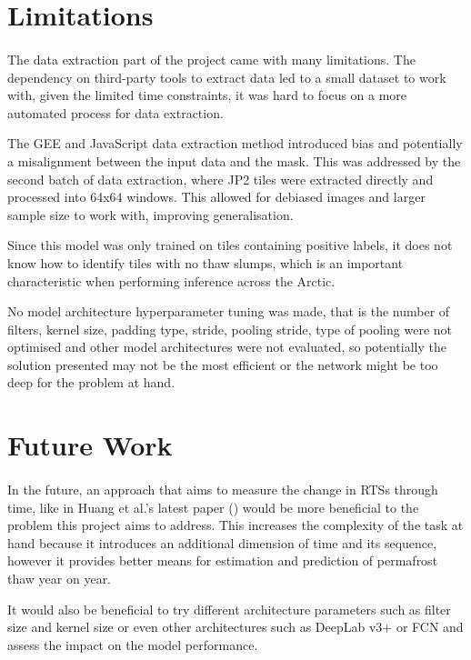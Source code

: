 \section{Limitations}
\paragraph{}
The data extraction part of the project came with many limitations. The dependency on third-party tools to extract data led to a small dataset to work with, given the limited time constraints, it was hard to focus on a more automated process for data extraction.

The \gls{GEE} and JavaScript data extraction method introduced bias and potentially a misalignment between the input data and the mask.  This was addressed by the second batch of data extraction, where \gls{JP2} tiles were extracted directly and processed into 64x64 windows. This allowed for debiased images and larger sample size to work with, improving generalisation.

Since this model was only trained on tiles containing positive labels, it does not know how to identify tiles with no thaw slumps, which is an important characteristic when performing inference across the Arctic. 

No model architecture hyperparameter tuning was made, that is the number of filters, kernel size, padding type, stride, pooling stride, type of pooling were not optimised and other model architectures were not evaluated, so potentially the solution presented may not be the most efficient or the network might be too deep for the problem at hand.

\section{Future Work}
\paragraph{}
In the future, an approach that aims to measure the change in \gls{RTS}s through time, like in Huang et al.'s latest paper (\cite{HUANG2021102399}) would be more beneficial to the problem this project aims to address. This increases the complexity of the task at hand because it introduces an additional dimension of time and its sequence, however it provides better means for estimation and prediction of permafrost thaw year on year.

It would also be beneficial to try different architecture parameters such as filter size and kernel size or even other architectures such as DeepLab v3+ or \gls{FCN} and assess the impact on the model performance.

